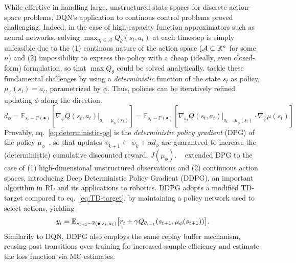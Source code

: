 While effective in handling large, unstructured state spaces for discrete action-space problems, DQN's application to continous control problems proved challenging.
Indeed, in the case of high-capacity function approximators such as neural networks, solving \( \max_{a_t \in \mathcal A} Q_\theta(s_t, a_t) \) at each timestep is simply unfeasible due to the (1) continous nature of the action space (\( \mathcal A \subset \mathbb R^n \) for some \( n \)) and (2) impossibility to express the policy with a cheap (ideally, even closed-form) formulation, so that \( \max Q_\theta \) could be solved analytically.
\citet{pmlr-v32-silver14} tackle these fundamental challenges by using a \emph{deterministic} function of the state \( s_t \) as policy, \( \mu_\phi(s_t) = a_t \), parametrized by \( \phi \). Thus, policies can be iteratively refined updating \( \phi \) along the direction:
\begin{equation}\label{eq:deterministic-pg}
    d_\phi = \mathbb E_{s_t \sim \mathbb P (\bullet)} \left[ \nabla_\phi Q(s_t, a_t)\vert_{a_t = \mu_\phi(s_t)} \right] = \mathbb E_{s_t \sim \mathbb P(\bullet)} \left[ \nabla_{a_t} Q(s_t, a_t) \vert_{a_t = \mu_\phi(s_t)} \cdot \nabla_\phi \mu(s_t) \right]
\end{equation}
Provably, eq.~\ref{eq:deterministic-pg} is the \emph{deterministic policy gradient} (DPG) of the policy \(\mu_\phi \)~\citep{pmlr-v32-silver14}, so that updates \( \phi_{k+1}\leftarrow \phi_k + \alpha d_\phi \) are guaranteed to increase the (deterministic) cumulative discounted reward, \( J(\mu_\phi) \).
~\citet{lillicrapContinuousControlDeep2019a} extended DPG to the case of (1) high-dimensional unstructured observations and (2) continuous action spaces, introducing Deep Deterministic Policy Gradient (DDPG), an important algorithm in RL and its applications to robotics.
DDPG adopts a modified TD-target compared to eq.~\ref{eq:TD-target}, by maintaining a policy network used to select actions, yielding
\begin{equation}\label{eq:TD-target-ddpg}
y_i = \mathbb E_{s_{t+1} \sim \mathbb P(\bullet \vert s_t, a_t)} \big[ r_t + \gamma Q_{\theta_{i-1}} (s_{t+1}, \mu_\phi(s_{t+1})) \big] .
\end{equation}
Similarily to DQN, DDPG also employs the same replay buffer mechanism, reusing past transitions over training for increased sample efficiency and estimate the loss function via MC-estimates.

